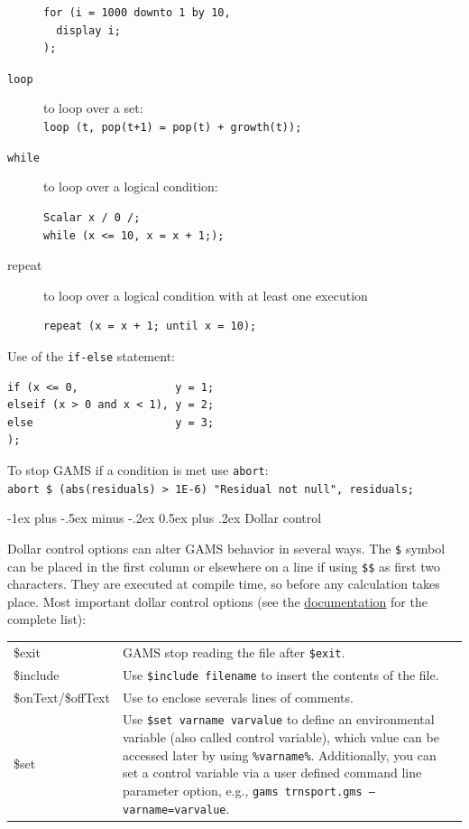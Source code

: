 \documentclass[10pt,landscape,a4paper]{article}
\makeatletter
\renewcommand{\section}{\@startsection{section}{1}{0mm}%
                                {-1ex plus -.5ex minus -.2ex}%
                                {0.5ex plus .2ex}%
                                {\color{blue}\normalfont\large\bfseries}}
\makeatother
\begin{document}
\begin{multicols}{2}
\begin{description}
\begin{multicols}{2}
\begin{verbatim}
for (i = 1000 downto 1 by 10,
  display i;
);
\end{verbatim}
\end{multicols}
\item[\texttt{loop}] to loop over a set:\\
  \verb!loop (t, pop(t+1) = pop(t) + growth(t));!
\item[\texttt{while}] to loop over a logical condition:\\
\begin{verbatim}
Scalar x / 0 /;
while (x <= 10, x = x + 1;);
\end{verbatim}
\item[repeat] to loop over a logical condition with at least one execution
\begin{verbatim}
repeat (x = x + 1; until x = 10);

\end{verbatim}
\end{description}

Use of the \verb!if-else! statement:\\
\begin{verbatim}
if (x <= 0,               y = 1;
elseif (x > 0 and x < 1), y = 2;
else                      y = 3;
);
\end{verbatim}

To stop GAMS if a condition is met use \verb!abort!:\\
\verb!abort $ (abs(residuals) > 1E-6) "Residual not null", residuals;!

\section{Dollar control}

Dollar control options can alter GAMS behavior in several ways. The \texttt{\$}
symbol can be placed in the first column or elsewhere on a line if using
\texttt{\$\$} as first two characters. They are executed at compile time, so
before any calculation takes place. Most important dollar control options (see
the
\href{https://www.gams.com/latest/docs/UG_DollarControlOptions.html}{documentation}
for the complete list):
\begin{tabularx}{\columnwidth}{@{}>{\ttfamily}lX@{}}
\$exit & GAMS stop reading the file after \texttt{\$exit}.\\
\$include & Use \texttt{\$include filename} to insert the contents of the
file.\\
\$onText\textrm{/}\$offText & Use to enclose severals lines of comments.\\
\$set & Use \texttt{\$set varname varvalue} to define an environmental
variable (also called control variable), which value can be accessed later by using
\texttt{\%varname\%}. Additionally, you can set a control variable via a user defined
command line parameter option, e.g., \texttt{gams~trnsport.gms --varname=varvalue}.
\end{tabularx}


\end{multicols}
\end{document}
